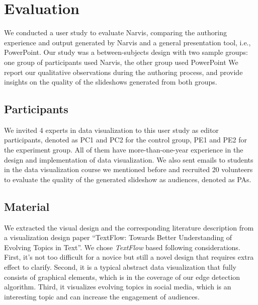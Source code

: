 \section{Evaluation}

We conducted a user study to evaluate Narvis, 
comparing the authoring experience and output generated by Narvis and a general presentation tool, i.e., PowerPoint.
Our study was a between-subjects design with two sample groups: one group of participants used Narvis, the other group used PowerPoint
We report our qualitative observations during the authoring process, and provide insights on the quality of the slideshows generated from both groups.

\subsection{Participants}
We invited 4 experts in data visualization to this user study as editor participants, denoted as PC1 and PC2 for the control group, PE1 and PE2 for the experiment group. All of them have more-than-one-year experience in the design and implementation of data visualization. We also sent emails to students in the data visualization course we mentioned before and recruited 20 volunteers to evaluate the quality of the generated slideshow as audiences, denoted as PAs. 
\subsection{Material}
We extracted the visual design and the corresponding literature description from  a visualization design paper ``TextFlow: Towards Better Understanding of Evolving Topics in Text''\cite{cui_textflow:_2011}.
We chose \textit{TextFlow} based following considerations. First, it's not too difficult for a novice but still a novel design that requires extra effect to clarify.
Second, it is a typical abstract data visualization that fully consists of graphical elements, which is in the coverage of our edge detection algorithm. 
Third, it visualizes evolving topics in social media, which is an interesting topic and can increase the engagement of audiences. 

